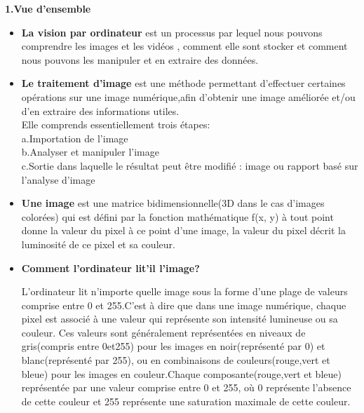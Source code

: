 \documentclass[12pt,a4paper]{article}
\begin{document}
\begin{center}
	\textbf{1.Vue d'ensemble}
\end{center}
\begin{itemize}
	\item \textbf{La vision par ordinateur} est un processus par lequel nous pouvons comprendre les images et les vidéos , comment elle sont stocker et comment nous pouvons les manipuler et en extraire des données.\\
	 
	\item \textbf{Le traitement d'image} est une méthode permettant d'effectuer certaines opérations sur une image numérique,afin d'obtenir une image améliorée et/ou d'en extraire des informations utiles.  \\
	Elle comprends essentiellement trois étapes:\\
	a.Importation de l’image\\
	b.Analyser et manipuler l’image\\
	c.Sortie dans laquelle le résultat peut être modifié : image ou rapport basé sur l’analyse d’image\\
	
	\item \textbf{Une image} est une matrice bidimensionnelle(3D dans le cas d'images colorées)
	qui est défini par la fonction mathématique	 f(x, y) à tout point donne la valeur du pixel à ce point d’une image, la valeur du pixel décrit la luminosité de ce pixel et sa couleur.\\
	
	\item \textbf{Comment l'ordinateur lit'il l'image?\\}
	
	L'ordinateur lit n'importe quelle image sous la forme d'une plage de valeurs comprise entre 0 et 255.C'est à dire que dans une image numérique, chaque pixel est associé à une valeur qui représente son intensité lumineuse ou sa couleur. Ces valeurs sont généralement représentées en niveaux de gris(compris entre 0et255) pour les images en noir(représenté par 0) et blanc(représenté par 255), ou en combinaisons de couleurs(rouge,vert et bleue) pour les images en couleur.Chaque composante(rouge,vert et bleue) représentée par une valeur comprise entre 0 et 255, où 0 représente l'absence de cette couleur et 255 représente une saturation maximale de cette couleur.\\	
\end{itemize}
\end{document}
